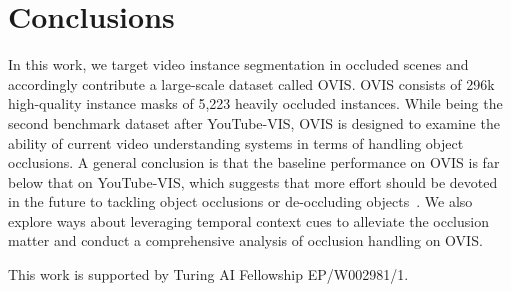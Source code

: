 \documentclass[twocolumn]{svjour3}          \smartqed  \usepackage{graphicx}
\begin{document}
\begin{sloppypar}
\section{Conclusions}
In this work, we target video instance segmentation in occluded scenes and accordingly contribute a large-scale dataset called OVIS. OVIS consists of 296k high-quality instance masks of 5,223 heavily occluded instances. While being the second benchmark dataset after YouTube-VIS, OVIS is designed to examine the ability of current video understanding systems in terms of handling object occlusions. A general conclusion is that the baseline performance on OVIS is far below that on YouTube-VIS, which suggests that more effort should be devoted in the future to tackling object occlusions or de-occluding objects~\cite{deocclusion}. We also explore ways about leveraging temporal context cues to alleviate the occlusion matter and conduct a comprehensive analysis of occlusion handling on OVIS.



\begin{acknowledgements}
This work is supported by Turing AI Fellowship EP/W002981/1.
\end{acknowledgements}





         



\end{sloppypar}
\end{document}
